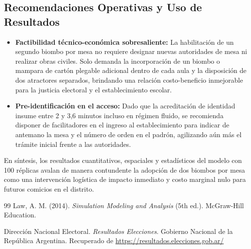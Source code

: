 \documentclass[11pt,a4paper]{article}
\begin{document}
\subsection{Recomendaciones Operativas y Uso de Resultados}
\begin{itemize}
    \item \textbf{Factibilidad técnico-económica sobresaliente:} La habilitación de un segundo biombo por mesa no requiere designar nuevas autoridades de mesa ni realizar obras civiles. Solo demanda la incorporación de un biombo o mampara de cartón plegable adicional dentro de cada aula y la disposición de dos atractores separados, brindando una relación costo-beneficio inmejorable para la justicia electoral y el establecimiento escolar.
    \item \textbf{Pre-identificación en el acceso:} Dado que la acreditación de identidad insume entre 2 y 3,6 minutos incluso en régimen fluido, se recomienda disponer de facilitadores en el ingreso al establecimiento para indicar de antemano la mesa y el número de orden en el padrón, agilizando aún más el trámite inicial frente a las autoridades.
\end{itemize}

En síntesis, los resultados cuantitativos, espaciales y estadísticos del modelo con 100 réplicas avalan de manera contundente la adopción de dos biombos por mesa como una intervención logística de impacto inmediato y costo marginal nulo para futuros comicios en el distrito.

\newpage
\begin{thebibliography}{99}
    Law, A. M. (2014). \textit{Simulation Modeling and Analysis} (5th ed.). McGraw-Hill Education.

    Dirección Nacional Electoral. \textit{Resultados Elecciones}. Gobierno Nacional de la República Argentina. Recuperado de \url{https://resultados.elecciones.gob.ar/}
\end{thebibliography}
\end{document}
